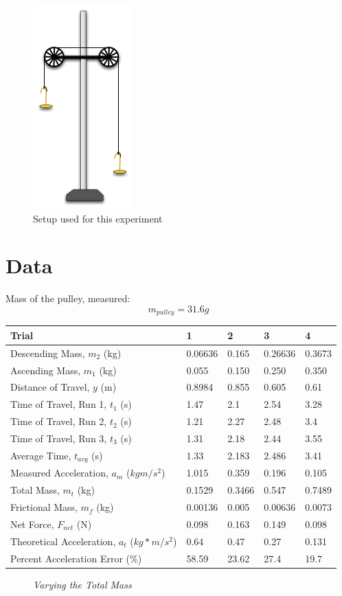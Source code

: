 \documentclass[11pt, titlepage]{article}
\begin{document}
\pagebreak
\begin{figure}[!ht]
\centering
\vspace*{1.5cm}
\includegraphics[scale=1.5, angle=0]{lab01.jpg}
\caption{Setup used for this experiment}
\end{figure}

\pagebreak
\section*{Data}
Mass of the pulley, measured:$$m_{pulley} = 31.6 g$$
\begin{center}
\begin{tabular}
{|m{7em}|m{7em}|m{7em}|m{7em}|m{7em}|}
\hline
Trial & 1 & 2 & 3 & 4 \\
\hline
Descending Mass, $m_2$ (kg) & 0.06636 & 0.165 & 0.26636 & 0.3673\\
\hline
Ascending Mass, $m_1$ (kg) & 0.055 & 0.150 & 0.250 & 0.350\\
\hline
Distance of Travel, $y$ (m) & 0.8984 & 0.855 & 0.605 & 0.61\\
\hline
Time of Travel, Run 1, $t_1$ (s) & 1.47 & 2.1 & 2.54 & 3.28\\
\hline
Time of Travel, Run 2, $t_2$ (s) & 1.21 & 2.27 & 2.48 & 3.4\\
\hline
Time of Travel, Run 3, $t_3$ (s) & 1.31 & 2.18 & 2.44 & 3.55\\
\hline
Average Time, $t_{avg}$ (s) & 1.33 & 2.183 & 2.486 & 3.41\\
\hline
Measured Acceleration, $a_m$ ($kgm/s^2$) & 1.015 & 0.359 & 0.196 & 0.105\\
\hline
Total Mass, $m_t$ (kg) & 0.1529 & 0.3466 & 0.547 & 0.7489\\
\hline
Frictional Mass, $m_f$ (kg) & 0.00136 & 0.005 & 0.00636 & 0.0073\\
\hline
Net Force, $F_{net}$ (N) & 0.098 & 0.163 & 0.149 & 0.098\\ 
\hline
Theoretical Acceleration, $a_t$ ($kg*m/s^2$) & 0.64 & 0.47 & 0.27 & 0.131\\
\hline
Percent Acceleration Error (\%) & 58.59 & 23.62 & 27.4 & 19.7\\
\hline
\end{tabular}
\begin{figure}[!ht]
\caption{\emph{Varying the Total Mass}}
\end{figure}
\end{center}
\pagebreak
\end{document}
